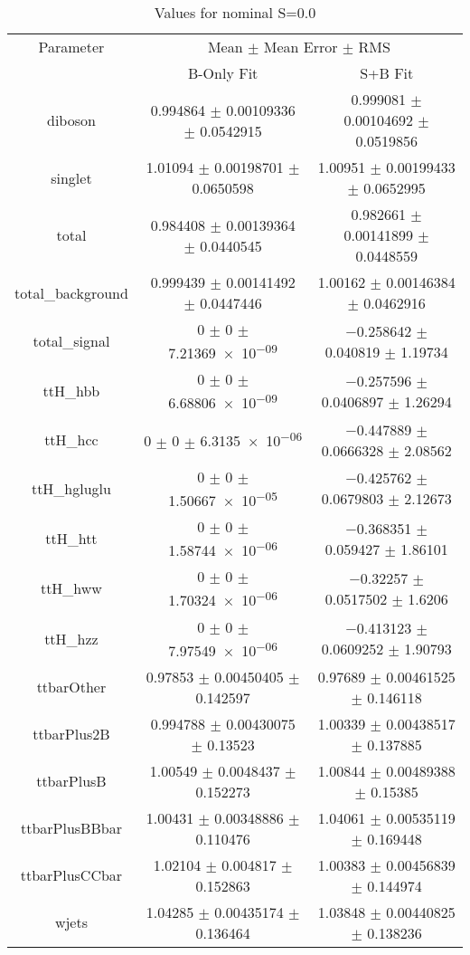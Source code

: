 \begin{table}
\centering
\caption{Values for nominal S=0.0}
\begin{tabular}{ccc}
\toprule
Parameter & \multicolumn{2}{c}{Mean $\pm$ Mean Error $\pm$ RMS}\\
 & B-Only Fit & S+B Fit\\
\midrule
diboson & \num{0.994864} $\pm$ \num{0.00109336} $\pm$ \num{0.0542915} & \num{0.999081} $\pm$ \num{0.00104692} $\pm$ \num{0.0519856}\\
singlet & \num{1.01094} $\pm$ \num{0.00198701} $\pm$ \num{0.0650598} & \num{1.00951} $\pm$ \num{0.00199433} $\pm$ \num{0.0652995}\\
total & \num{0.984408} $\pm$ \num{0.00139364} $\pm$ \num{0.0440545} & \num{0.982661} $\pm$ \num{0.00141899} $\pm$ \num{0.0448559}\\
total\_background & \num{0.999439} $\pm$ \num{0.00141492} $\pm$ \num{0.0447446} & \num{1.00162} $\pm$ \num{0.00146384} $\pm$ \num{0.0462916}\\
total\_signal & \num{0} $\pm$ \num{0} $\pm$ \num{7.21369e-09} & \num{-0.258642} $\pm$ \num{0.040819} $\pm$ \num{1.19734}\\
ttH\_hbb & \num{0} $\pm$ \num{0} $\pm$ \num{6.68806e-09} & \num{-0.257596} $\pm$ \num{0.0406897} $\pm$ \num{1.26294}\\
ttH\_hcc & \num{0} $\pm$ \num{0} $\pm$ \num{6.3135e-06} & \num{-0.447889} $\pm$ \num{0.0666328} $\pm$ \num{2.08562}\\
ttH\_hgluglu & \num{0} $\pm$ \num{0} $\pm$ \num{1.50667e-05} & \num{-0.425762} $\pm$ \num{0.0679803} $\pm$ \num{2.12673}\\
ttH\_htt & \num{0} $\pm$ \num{0} $\pm$ \num{1.58744e-06} & \num{-0.368351} $\pm$ \num{0.059427} $\pm$ \num{1.86101}\\
ttH\_hww & \num{0} $\pm$ \num{0} $\pm$ \num{1.70324e-06} & \num{-0.32257} $\pm$ \num{0.0517502} $\pm$ \num{1.6206}\\
ttH\_hzz & \num{0} $\pm$ \num{0} $\pm$ \num{7.97549e-06} & \num{-0.413123} $\pm$ \num{0.0609252} $\pm$ \num{1.90793}\\
ttbarOther & \num{0.97853} $\pm$ \num{0.00450405} $\pm$ \num{0.142597} & \num{0.97689} $\pm$ \num{0.00461525} $\pm$ \num{0.146118}\\
ttbarPlus2B & \num{0.994788} $\pm$ \num{0.00430075} $\pm$ \num{0.13523} & \num{1.00339} $\pm$ \num{0.00438517} $\pm$ \num{0.137885}\\
ttbarPlusB & \num{1.00549} $\pm$ \num{0.0048437} $\pm$ \num{0.152273} & \num{1.00844} $\pm$ \num{0.00489388} $\pm$ \num{0.15385}\\
ttbarPlusBBbar & \num{1.00431} $\pm$ \num{0.00348886} $\pm$ \num{0.110476} & \num{1.04061} $\pm$ \num{0.00535119} $\pm$ \num{0.169448}\\
ttbarPlusCCbar & \num{1.02104} $\pm$ \num{0.004817} $\pm$ \num{0.152863} & \num{1.00383} $\pm$ \num{0.00456839} $\pm$ \num{0.144974}\\
wjets & \num{1.04285} $\pm$ \num{0.00435174} $\pm$ \num{0.136464} & \num{1.03848} $\pm$ \num{0.00440825} $\pm$ \num{0.138236}\\
\bottomrule
\end{tabular}
\end{table}
